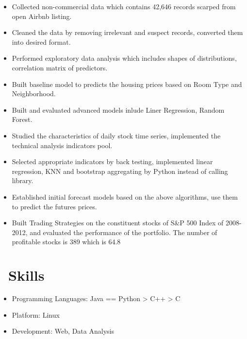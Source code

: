 \documentclass{resume}
\begin{document}
\begin{itemize}
  \item Collected non-commercial data which contains 42,646 records scarped from open Airbnb listing.
  \item Cleaned the data by removing irrelevant and suspect records, converted them into desired format.
  \item Performed exploratory data analysis which includes shapes of distributions, correlation matrix of predictors.
  \item Built baseline model to predicts the housing prices based on Room Type and Neighborhood.
  \item Built and evaluated advanced models inlude Liner Regression, Random Forest.
\end{itemize}

\begin{itemize}
  \item Studied the characteristics of daily stock time series, implemented the technical analysis indicators pool.
  \item Selected appropriate indicators by back testing, implemented linear regression, KNN and bootstrap aggregating by Python instead of calling library.
  \item Established initial forecast models based on the above algorithms, use them to predict the futures prices.
  \item Built Trading Strategies on the constituent stocks of S&P 500 Index of 2008-2012, and evaluated the performance of the portfolio. The number of profitable stocks is 389 which is 64.8%
\end{itemize}


\section{\faCogs\ Skills}
\begin{itemize}[parsep=0.5ex]
  \item Programming Languages: Java == Python > C++ > C
  \item Platform: Linux
  \item Development: Web, Data Analysis
\end{itemize}
\end{document}
